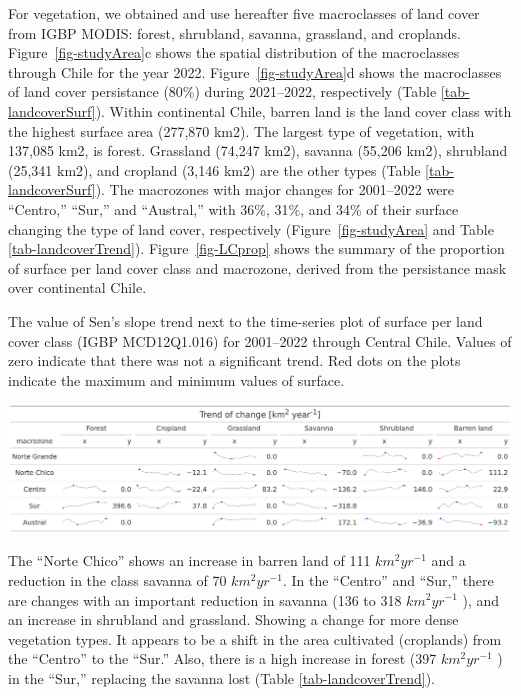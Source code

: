\documentclass[
  authoryear,
  preprint,
  3p,
  onecolumn]{elsarticle}
\begin{document}
For vegetation, we obtained and use hereafter five macroclasses of land
cover from IGBP MODIS: forest, shrubland, savanna, grassland, and
croplands. Figure~\ref{fig-studyArea}c shows the spatial distribution of
the macroclasses through Chile for the year 2022.
Figure~\ref{fig-studyArea}d shows the macroclasses of land cover
persistance (80\%) during 2021--2022, respectively (Table
\ref{tab-landcoverSurf}). Within continental Chile, barren land is the
land cover class with the highest surface area (277,870 km2). The
largest type of vegetation, with 137,085 km2, is forest. Grassland
(74,247 km2), savanna (55,206 km2), shrubland (25,341 km2), and cropland
(3,146 km2) are the other types (Table \ref{tab-landcoverSurf}). The
macrozones with major changes for 2001--2022 were ``Centro,'' ``Sur,''
and ``Austral,'' with 36\%, 31\%, and 34\% of their surface changing the
type of land cover, respectively (Figure~\ref{fig-studyArea} and Table
\ref{tab-landcoverTrend}). Figure~\ref{fig-LCprop} shows the summary of
the proportion of surface per land cover class and macrozone, derived
from the persistance mask over continental Chile.

\begin{table}[!ht]
\caption{The value of Sen's slope trend next to the time-series plot of surface per land cover class (IGBP MCD12Q1.016) for 2001–2022 through Central Chile. Values of zero indicate that there was not a significant trend. Red dots on the plots indicate the maximum and minimum values of surface.}
\label{tab-landcoverTrend}
\includegraphics[]{../output/figs/table_var_landcover_macro.png}
\end{table}

The ``Norte Chico'' shows an increase in barren land of 111
\(km^2 yr^{-1}\) and a reduction in the class savanna of 70
\(km^2 yr^{-1}\). In the ``Centro'' and ``Sur,'' there are changes with
an important reduction in savanna (136 to 318 \(km^2 yr^{-1}\) ), and an
increase in shrubland and grassland. Showing a change for more dense
vegetation types. It appears to be a shift in the area cultivated
(croplands) from the ``Centro'' to the ``Sur.'' Also, there is a high
increase in forest (397 \(km^2 yr^{-1}\) ) in the ``Sur,'' replacing the
savanna lost (Table \ref{tab-landcoverTrend}).
\end{document}
